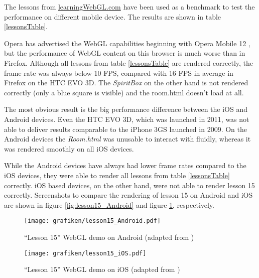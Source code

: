 \documentclass[12pt,journal,compsoc]{IEEEtran}
\begin{document}
The lessons from \url{learningWebGL.com} \cite{learningwebgl} have been used as a benchmark to test the performance on different mobile device. The results are shown in table \ref{lessonsTable}.

Opera has advertised the WebGL capabilities beginning with Opera Mobile 12 \cite{opera12}, but the performance of WebGL content on this browser is much worse than in Firefox. Although all lessons from table \ref{lessonsTable} are rendered correctly, the frame rate was always below 10 FPS, compared with 16 FPS in average in Firefox on the HTC EVO 3D. The \textit{SpiritBox} on the other hand is not rendered correctly (only a blue square is visible) and the room.html doesn’t load at all.

The most obvious result is the big performance difference between the iOS and Android devices. Even the HTC EVO 3D, which was launched in 2011, was not able to deliver results comparable to the iPhone 3GS launched in 2009. On the Android devices the \textit{Room.html} was unusable to interact with fluidly, whereas it was rendered smoothly on all iOS devices. 

While the Android devices have always had lower frame rates compared to the iOS devices, they were able to render all lessons from table \ref{lessonsTable} correctly. iOS based  devices, on the other hand, were not able to render lesson 15 correctly. Screenshots to compare the rendering of lesson 15 on Android and iOS are shown in figure \ref{fig:lesson15_Android} and figure \ref{fig:lesson15_iOS}, respectively. 

\begin{figure}[h]
  \hfill
  \begin{minipage}[t]{.45\textwidth}
    \begin{center}
	\texttt{[image: grafiken/lesson15\_Android.pdf]}
      \caption{“Lesson 15” WebGL demo on Android (adapted from \cite{lesson15})}
      \label{fig:lesson15_Android}
    \end{center}
  \end{minipage}
  \hfill
  \begin{minipage}[t]{.45\textwidth}
    \begin{center}  
    \texttt{[image: grafiken/lesson15\_iOS.pdf]}
      \caption{“Lesson 15” WebGL demo on iOS (adapted from \cite{lesson15})}
      \label{fig:lesson15_iOS}
    \end{center}
  \end{minipage}
  \hfill
\end{figure}
\end{document}
